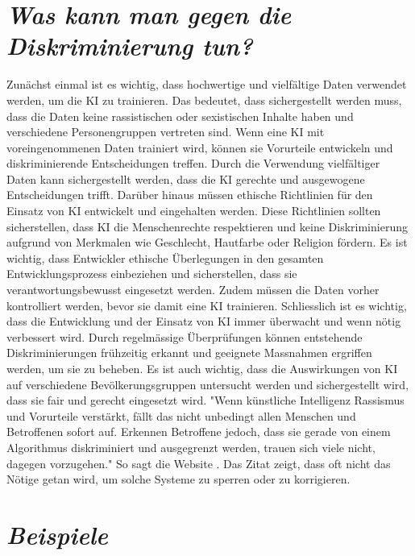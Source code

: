 \documentclass{article}
\begin{document}
\section{\textit{Was kann man gegen die Diskriminierung tun?}}
Zunächst einmal ist es wichtig, dass hochwertige und vielfältige Daten verwendet werden, um die KI zu trainieren. Das bedeutet, dass sichergestellt werden muss, dass die Daten keine rassistischen oder sexistischen Inhalte haben und verschiedene Personengruppen vertreten sind. Wenn eine KI mit voreingenommenen Daten trainiert wird, können sie Vorurteile entwickeln und diskriminierende Entscheidungen treffen. Durch die Verwendung vielfältiger Daten kann sichergestellt werden, dass die KI gerechte und ausgewogene Entscheidungen trifft. Darüber hinaus müssen ethische Richtlinien für den Einsatz von KI entwickelt und eingehalten werden. Diese Richtlinien sollten sicherstellen, dass KI die Menschenrechte respektieren und keine Diskriminierung aufgrund von Merkmalen wie Geschlecht, Hautfarbe oder Religion fördern. Es ist wichtig, dass Entwickler ethische Überlegungen in den gesamten Entwicklungsprozess einbeziehen und sicherstellen, dass sie verantwortungsbewusst eingesetzt werden. Zudem müssen die Daten vorher kontrolliert werden, bevor sie damit eine KI trainieren. Schliesslich ist es wichtig, dass die Entwicklung und der Einsatz von KI immer überwacht und wenn nötig verbessert wird. Durch regelmässige Überprüfungen können entstehende Diskriminierungen frühzeitig erkannt und geeignete Massnahmen ergriffen werden, um sie zu beheben. Es ist auch wichtig, dass die Auswirkungen von KI auf verschiedene Bevölkerungsgruppen untersucht werden und sichergestellt wird, dass sie fair und gerecht eingesetzt wird. "Wenn künstliche Intelligenz Rassismus und Vorurteile verstärkt, fällt das nicht unbedingt allen Menschen und Betroffenen sofort auf. Erkennen Betroffene jedoch, dass sie gerade von einem Algorithmus diskriminiert und ausgegrenzt werden, trauen sich viele nicht, dagegen vorzugehen." So sagt die Website \citep{KI-Rassismus}. Das Zitat zeigt, dass oft nicht das Nötige getan wird, um solche Systeme zu sperren oder zu korrigieren.

\section{\textit{Beispiele}}
\end{document}
